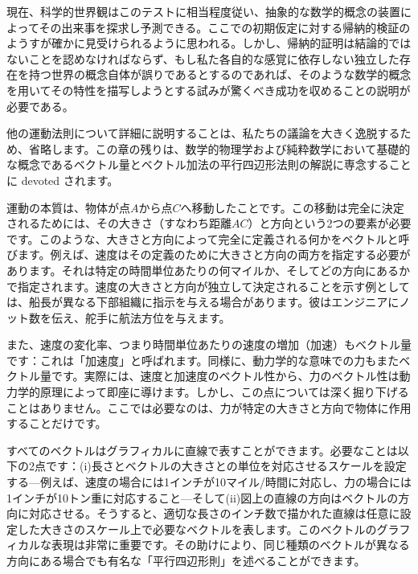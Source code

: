 \documentclass[a4paper,11pt,openany]{ltjsbook}
\begin{document}
現在、科学的世界観はこのテストに相当程度従い、抽象的な数学的概念の装置によってその出来事を探求し予測できる。ここでの初期仮定に対する帰納的検証のようすが確かに見受けられるように思われる。しかし、帰納的証明は結論的ではないことを認めなければならず、もし私た各自的な感覚に依存しない独立した存在を持つ世界の概念自体が誤りであるとするのであれば、そのような数学的概念を用いてその特性を描写しようとする試みが驚くべき成功を収めることの説明が必要である。

他の運動法則について詳細に説明することは、私たちの議論を大きく逸脱するため、省略します。この章の残りは、数学的物理学および純粋数学において基礎的な概念であるベクトル量とベクトル加法の平行四辺形法則の解説に専念することに devoted されます。

運動の本質は、物体が点$A$から点$C$へ移動したことです。この移動は完全に決定されるためには、その大きさ（すなわち距離$AC$）と方向という2つの要素が必要です。このような、大きさと方向によって完全に定義される何かをベクトルと呼びます。例えば、速度はその定義のために大きさと方向の両方を指定する必要があります。それは特定の時間単位あたりの何マイルか、そしてどの方向にあるかで指定されます。速度の大きさと方向が独立して決定されることを示す例としては、船長が異なる下部組織に指示を与える場合があります。彼はエンジニアにノット数を伝え、舵手に航法方位を与えます。

また、速度の変化率、つまり時間単位あたりの速度の増加（加速）もベクトル量です：これは「加速度」と呼ばれます。同様に、動力学的な意味での力もまたベクトル量です。実際には、速度と加速度のベクトル性から、力のベクトル性は動力学的原理によって即座に導けます。しかし、この点については深く掘り下げることはありません。ここでは必要なのは、力が特定の大きさと方向で物体に作用することだけです。

すべてのベクトルはグラフィカルに直線で表すことができます。必要なことは以下の2点です：(i)長さとベクトルの大きさとの単位を対応させるスケールを設定する---例えば、速度の場合には1インチが10マイル/時間に対応し、力の場合には1インチが10トン重に対応すること---そして(ii)図上の直線の方向はベクトルの方向に対応させる。そうすると、適切な長さのインチ数で描かれた直線は任意に設定した大きさのスケール上で必要なベクトルを表します。このベクトルのグラフィカルな表現は非常に重要です。その助けにより、同じ種類のベクトルが異なる方向にある場合でも有名な「平行四辺形則」を述べることができます。
\end{document}
